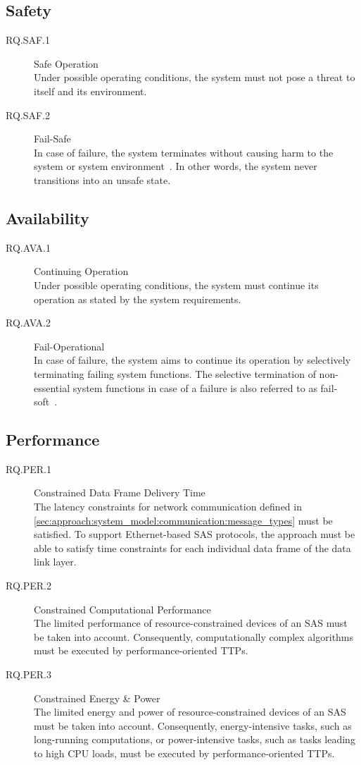 \subsection{Safety}
\begin{description}
    \item[RQ.SAF.1] Safe Operation\\
    Under possible operating conditions, the system must not pose a threat to itself and its environment.
    \item[RQ.SAF.2] Fail-Safe\\
    In case of failure, the system terminates without causing harm to the system or system environment~\cite{rfc4949}.
    In other words, the system never transitions into an unsafe state.
\end{description}

\subsection{Availability}
\begin{description}
    \item[RQ.AVA.1] Continuing Operation\\
    Under possible operating conditions, the system must continue its operation as stated by the system requirements.
    \item[RQ.AVA.2] Fail-Operational\\
    In case of failure, the system aims to continue its operation by selectively terminating failing system functions.
    The selective termination of non-essential system functions in case of a failure is also referred to as fail-soft~\cite{rfc4949}.
\end{description}

\subsection{Performance}
\begin{description}
    \item[RQ.PER.1] Constrained Data Frame Delivery Time\\
    The latency constraints for network communication defined in \autoref{sec:approach:system_model:communication:message_types} must be satisfied.
    To support Ethernet-based SAS protocols, the approach must be able to satisfy time constraints for each individual data frame of the data link layer.
    \item[RQ.PER.2] Constrained Computational Performance\\
    The limited performance of resource-constrained devices of an SAS must be taken into account.
    Consequently, computationally complex algorithms must be executed by performance-oriented TTPs.
    \item[RQ.PER.3] Constrained Energy \& Power\\
    The limited energy and power of resource-constrained devices of an SAS must be taken into account.
    Consequently, energy-intensive tasks, such as long-running computations, or power-intensive tasks, such as tasks leading to high CPU loads, must be executed by performance-oriented TTPs.
\end{description}

